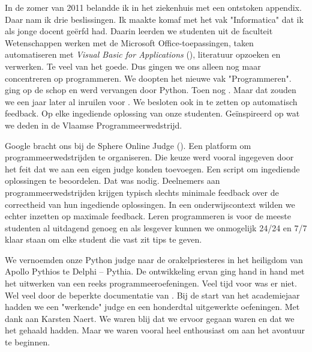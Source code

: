
In de zomer van 2011 belandde ik in het ziekenhuis met een ontstoken appendix.
Daar nam ik drie beslissingen.
Ik maakte komaf met het vak "Informatica" dat ik als jonge docent geërfd had.
Daarin leerden we studenten uit de faculteit Wetenschappen werken met de Microsoft Office-toepassingen, taken automatiseren met \emph{Visual Basic for Applications} (), literatuur opzoeken en verwerken.
Te veel van het goede.
Dus gingen we ons alleen nog maar concentreren op programmeren.
We doopten het nieuwe vak "Programmeren".
 ging op de schop en werd vervangen door Python.
Toen nog .
Maar dat zouden we een jaar later al inruilen voor .
We besloten ook in te zetten op automatisch feedback.
Op elke ingediende oplossing van onze studenten.
Geïnspireerd op wat we deden in de Vlaamse Programmeerwedstrijd.

Google bracht ons bij de Sphere Online Judge ().
Een platform om programmeerwedstrijden te organiseren.
Die keuze werd vooral ingegeven door het feit dat we aan  een eigen judge konden toevoegen.
Een script om ingediende oplossingen te beoordelen.
Dat was nodig.
Deelnemers aan programmeerwedstrijden krijgen typisch slechts minimale feedback over de correctheid van hun ingediende oplossingen.
In een onderwijscontext wilden we echter inzetten op maximale feedback.
Leren programmeren is voor de meeste studenten al uitdagend genoeg en als lesgever kunnen we onmogelijk 24/24 en 7/7 klaar staan om elke student die vast zit tips te geven.

We vernoemden onze Python judge naar de orakelpriesteres in het heiligdom van Apollo Pythios te Delphi -- Pythia.
De ontwikkeling ervan ging hand in hand met het uitwerken van een reeks programmeeroefeningen.
Veel tijd voor  was er niet.
Wel veel  door de beperkte documentatie van .
Bij de start van het academiejaar hadden we een "werkende" judge en een honderdtal uitgewerkte oefeningen.
Met dank aan Karsten Naert.
We waren blij dat we ervoor gegaan waren en dat we het gehaald hadden.
Maar we waren vooral heel enthousiast om aan het avontuur te beginnen.

